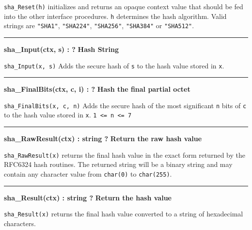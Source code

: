 \noindent
{}
\texttt{sha\_Reset(h)} initializes and returns an opaque context value that
should be fed into the other interface procedures. \texttt{h} determines the
hash algorithm. Valid strings are \texttt{"SHA1"}, \texttt{"SHA224"},
\texttt{"SHA256"}, \texttt{"SHA384"} or \texttt{"SHA512"}.

\bigskip\hrule\vspace{0.1cm}
\noindent
{\bf sha\_Input(ctx, s) : ? } \hfill {\bf Hash String}

\noindent
{}
\texttt{sha\_Input(x, s)} Adds the secure hash of \texttt{s} to the hash value
stored in \texttt{x}.

\bigskip\hrule\vspace{0.1cm}
\noindent
{\bf sha\_FinalBits(ctx, c, i) : ? } \hfill {\bf Hash the final partial octet}

\noindent
{}
\texttt{sha\_FinalBits(x, c, n)} Adds the secure hash of the most significant
\texttt{n} bits of \texttt{c} to the hash value stored in \texttt{x}.
\verb|1 <= n <= 7|

\bigskip\hrule\vspace{0.1cm}
\noindent
{\bf sha\_RawResult(ctx) : string ? } \hfill {\bf Return the raw hash value}

\noindent
{}
\texttt{sha\_RawResult(x)} returns the final hash value in the exact form
returned by the RFC6324 hash routines. The returned string will be a binary
string and may contain any character value from \texttt{char(0)} to
\texttt{char(255)}.

\bigskip\hrule\vspace{0.1cm}
\noindent
{\bf sha\_Result(ctx) : string ? } \hfill {\bf Return the hash value}

\noindent
{}
\texttt{sha\_Result(x)} returns the final hash value converted to a string of
hexadecimal characters.

